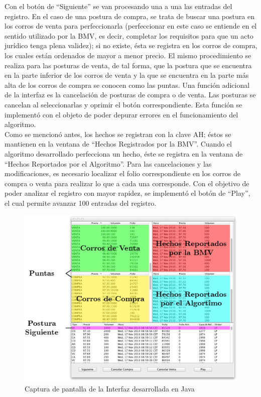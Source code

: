 \documentclass[11pt]{article}
\numberwithin{equation}{section} %
\begin{document}
Con el botón de ``Siguiente'' se van procesando una a una las entradas del registro. En el caso de una postura de compra, se trata de buscar una postura en los corros de venta para perfeccionarla (perfeccionar en este caso se entiende en el sentido utilizado por la BMV, es decir, completar los requisitos para que un acto jurídico tenga plena validez); si no existe, ésta se registra en los corros de compra, los cuales están ordenados de mayor a menor precio. El mismo procedimiento se realiza para las posturas de venta, de tal forma, que la postura que se encuentra en la parte inferior de los corros de venta y la que se encuentra en la parte más alta de los corros de compra se conocen como las puntas. Una función adicional de la interfaz es la cancelación de posturas de compra o de venta. Las posturas se cancelan al seleccionarlas y oprimir el botón correspondiente. Esta función se implementó con el objeto de poder depurar errores en el funcionamiento del algoritmo.\\

Como se mencionó antes, los hechos se registran con la clave AH; éstos se mantienen en la ventana de ``Hechos Registrados por la BMV''. Cuando el algoritmo desarrollado perfecciona un hecho, éste se registra en la ventana de ``Hechos Reportados por el Algoritmo''. Para las cancelaciones y las modificaciones, es necesario localizar el folio correspondiente en los corros de compra o venta para realizar lo que a cada una corresponde. Con el objetivo de poder analizar el registro con mayor rapidez, se implementó el botón de ``Play'', el cual permite avanzar 100 entradas del registro.

\begin{landscape}

\begin{figure}[htbp] \centering
\includegraphics{screenshot.png}
\caption{Captura de pantalla de la Interfaz desarrollada en Java}
\label{java}
\end{figure}

\end{landscape}
\end{document}
